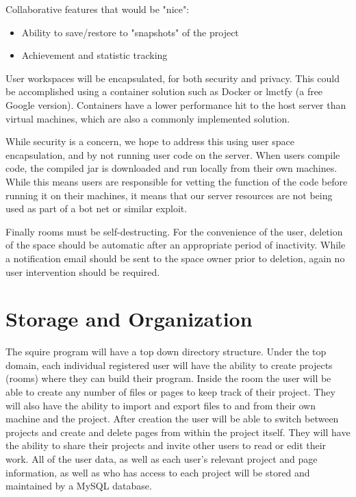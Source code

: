 \documentclass[11pt]{report}
\begin{document}
    Collaborative features that would be "nice":
    \begin{itemize}
      \item Ability to save/restore to "snapshots" of the project
      \item Achievement and statistic tracking
    \end{itemize}
    
    User workspaces will be encapsulated, for both security and privacy. This could be accomplished using a container solution such as Docker or lmctfy (a free Google version). Containers have a lower performance hit to the host server than virtual machines, which are also a commonly implemented solution.  
    
    While security is a concern, we hope to address this using user space encapsulation, and by not running user code on the server. When users compile code, the compiled jar is downloaded and run locally from their own machines. While this means users are responsible for vetting the function of the code before running it on their machines, it means that our server resources are not being used as part of a bot net or similar exploit.
    
    Finally rooms must be self-destructing. For the convenience of the user, deletion of the space should be automatic after an appropriate period of inactivity. While a notification email should be sent to the space owner prior to deletion, again no user intervention should be required.

\section{Storage and Organization}
    The squire program will have a top down directory structure.
    Under the top domain, each individual registered user will have the ability to create projects (rooms) where they can build their program. 
    Inside the room the user will be able to create any number of files or pages to keep track of their project. 
    They will also have the ability to import and export files to and from their own machine and the project. 
    After creation the user will be able to switch between projects and create and delete pages from within the project itself.  
    They will have the ability to share their projects and invite other users to read or edit their work. 
    All of the user data, as well as each user’s relevant project and page information, as well as who has access to each project will be stored and maintained by a MySQL database.
\end{document}

